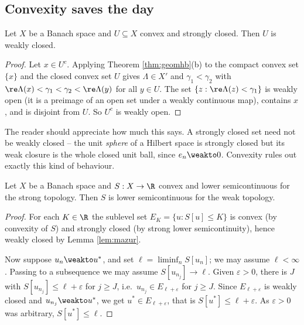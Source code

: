 \subsection{Convexity saves the day}

\begin{lemma}[Mazur]\label{lem:mazur}
	Let $X$ be a Banach space and $U \subseteq X$ convex and strongly closed. Then $U$ is weakly closed.
\end{lemma}

\begin{proof}
	Let $x \in U^c$. Applying Theorem \ref{thm:geomhb}(b) to the compact convex set $\{x\}$ and the closed convex set $U$ gives $\Lambda \in X'$ and $\gamma_1 < \gamma_2$ with $\re\Lambda(x) < \gamma_1 < \gamma_2 < \re \Lambda(y)$ for all $y \in U$. The set $\{z : \re \Lambda(z) < \gamma_1\}$ is weakly open (it is a preimage of an open set under a weakly continuous map), contains $x$, and is disjoint from $U$. So $U^c$ is weakly open.
\end{proof}

The reader should appreciate how much this says. A strongly closed set need not be weakly closed -- the unit \emph{sphere} of a Hilbert space is strongly closed but its weak closure is the whole closed unit ball, since $e_n \weakto 0$. Convexity rules out exactly this kind of behaviour.

\begin{theorem}\label{thm:convexweaklsc}
	Let $X$ be a Banach space and $S : X \to \R$ convex and lower semicontinuous for the strong topology. Then $S$ is lower semicontinuous for the weak topology.
\end{theorem}

\begin{proof}
	For each $K \in \R$ the sublevel set $E_K = \{u : S[u]\le K\}$ is convex (by convexity of $S$) and strongly closed (by strong lower semicontinuity), hence weakly closed by Lemma \ref{lem:mazur}.

	Now suppose $u_n \weakto u^*$, and set $\ell = \liminf_n S[u_n]$; we may assume $\ell < \infty$. Passing to a subsequence we may assume $S[u_{n_j}]\to \ell$. Given $\varepsilon > 0$, there is $J$ with $S[u_{n_j}]\le \ell + \varepsilon$ for $j \ge J$, i.e.\ $u_{n_j}\in E_{\ell + \varepsilon}$ for $j \ge J$. Since $E_{\ell+\varepsilon}$ is weakly closed and $u_{n_j}\weakto u^*$, we get $u^* \in E_{\ell+\varepsilon}$, that is $S[u^*]\le\ell+\varepsilon$. As $\varepsilon > 0$ was arbitrary, $S[u^*]\le\ell$.
\end{proof}

